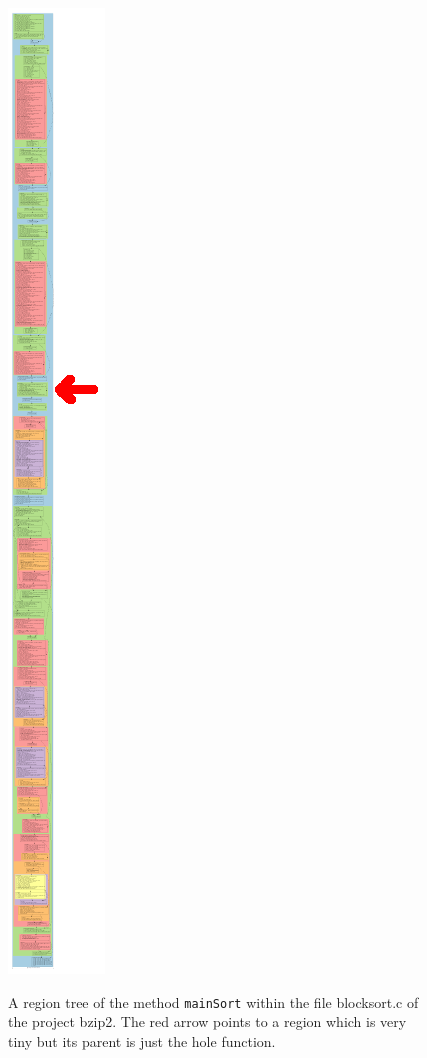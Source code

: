 \begin{figure}
    \caption[A region tree of bzip2]{
        A region tree of the method \texttt{mainSort} within the file blocksort.c of the project bzip2.
        The red arrow points to a region which is very tiny but its parent is just the hole function.
    }
    \includegraphics[height=\textheight]{gfx/fatParent.png}
    \label{fig:fatParent}
\end{figure}
